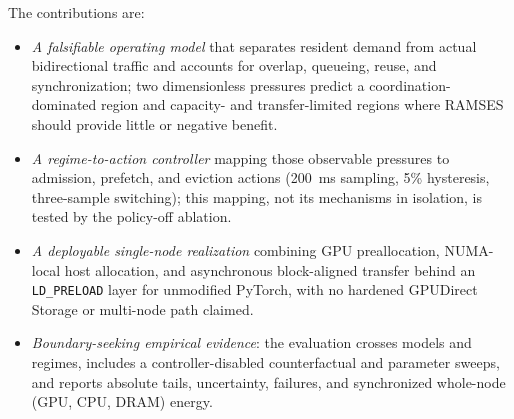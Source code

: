 The contributions are:
\begin{itemize}
\item \emph{A falsifiable operating model} that separates resident demand from actual bidirectional traffic and accounts for overlap, queueing, reuse, and synchronization; two dimensionless pressures predict a coordination-dominated region and capacity- and transfer-limited regions where RAMSES should provide little or negative benefit.
\item \emph{A regime-to-action controller} mapping those observable pressures to admission, prefetch, and eviction actions (200~ms sampling, 5\% hysteresis, three-sample switching); this mapping, not its mechanisms in isolation, is tested by the policy-off ablation.
\item \emph{A deployable single-node realization} combining GPU preallocation, NUMA-local host allocation, and asynchronous block-aligned transfer behind an \texttt{LD\_PRELOAD} layer for unmodified PyTorch, with no hardened GPUDirect Storage or multi-node path claimed.
\item \emph{Boundary-seeking empirical evidence}: the evaluation crosses models and regimes, includes a controller-disabled counterfactual and parameter sweeps, and reports absolute tails, uncertainty, failures, and synchronized whole-node (GPU, CPU, DRAM) energy.
\end{itemize}

